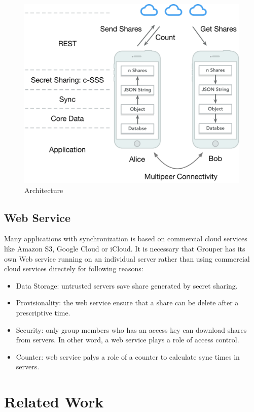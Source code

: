 \documentclass[twocolumn,10pt]{article}
\begin{document}
\begin{figure}[t]
\centering
\includegraphics[scale=0.4]{architecture}
\caption{Architecture}
\end{figure}

\subsection{Web Service}
Many applications with synchronization is based on commercial cloud services like Amazon S3, Google Cloud or iCloud. It is necessary that Grouper has its own Web service running on an individual server rather than using commercial cloud services directely for following reasons:

\begin{itemize}
\setlength{\itemsep}{1pt}
\setlength{\parskip}{0pt}
\setlength{\parsep}{0pt}
    \item Data Storage: untrusted servers save share generated by secret sharing.
    \item Provisionality: the web service ensure that a share can be delete after a prescriptive time.
    \item Security: only group members who has an access key can download shares from servers. In other word, a web service plays a role of access control.
    \item Counter: web service palys a role of a counter to calculate sync times in servers.
\end{itemize}

\section{Related Work}
\end{document}
